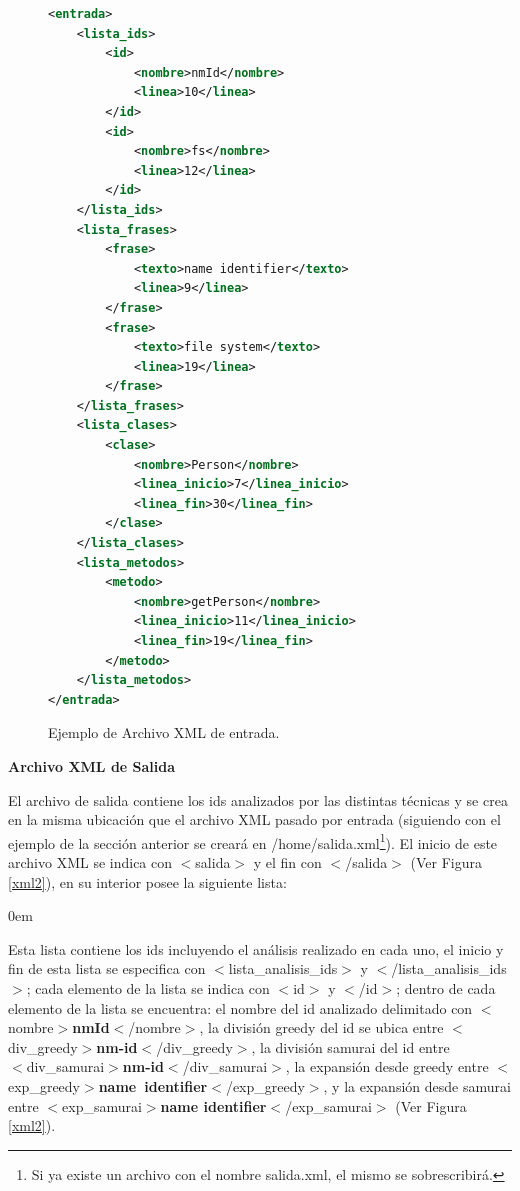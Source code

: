 \begin{appendices}
\newpage
\begin{figure}[h!] %
\begin{lstlisting}[language=xml, frame=single]
<entrada>
	<lista_ids>
		<id>
		    <nombre>nmId</nombre>
		    <linea>10</linea>
		</id>    
		<id>	    	
		    <nombre>fs</nombre>
		    <linea>12</linea>
		</id>    	    	    
	</lista_ids>
	<lista_frases>
		<frase>
			<texto>name identifier</texto>
			<linea>9</linea>
		</frase>
		<frase>
			<texto>file system</texto>
			<linea>19</linea>
		</frase>
	</lista_frases>
	<lista_clases>
		<clase>
			<nombre>Person</nombre>
			<linea_inicio>7</linea_inicio>
			<linea_fin>30</linea_fin>
		</clase>
	</lista_clases>
	<lista_metodos>
		<metodo>
			<nombre>getPerson</nombre>
			<linea_inicio>11</linea_inicio>
			<linea_fin>19</linea_fin>
		</metodo>				
	</lista_metodos>	
</entrada>

\end{lstlisting}
\caption{Ejemplo de Archivo XML de entrada.}
\label{xml1}
\end{figure}

\newpage

\noindent \textbf{Archivo XML de Salida\\}

El archivo de salida contiene los ids analizados por las distintas técnicas y se crea en la misma ubicación que el archivo XML pasado por entrada (siguiendo con el ejemplo de la sección anterior se creará en \textsf{/home/salida.xml}\footnote[1]{Si ya existe un archivo con el nombre salida.xml, el mismo se sobrescribirá.}). El inicio de este archivo XML se indica con \mbox{$<$\textsf{salida}$>$} y el fin con \mbox{$<$/\textsf{salida}$>$} (Ver Figura \ref{xml2}), en su interior posee la siguiente lista:

\begin{description}
\itemsep0em%
\item[Lista de Identificadores Analizados:] Esta lista contiene los ids incluyendo el análisis realizado en cada uno, el inicio y fin de esta lista se especifica con  $<$\textsf{lista\_analisis\_ids}$>$ y $<$/\textsf{lista\_analisis\_ids}$>$; cada elemento de la lista se indica con $<$\textsf{id}$>$ y $<$/\textsf{id}$>$; dentro de cada elemento de la lista se encuentra: el nombre del id analizado delimitado con \mbox{$<$\textsf{nombre}$>$\textbf{nmId}$<$/\textsf{nombre}$>$}, la división greedy del id se ubica entre \mbox{$<$\textsf{div\_greedy}$>$\textbf{nm-id}$<$/\textsf{div\_greedy}$>$}, la división samurai del id entre\\ \mbox{$<$\textsf{div\_samurai}$>$\textbf{nm-id}$<$/\textsf{div\_samurai}$>$}, la expansión desde greedy entre \mbox{$<$\textsf{exp\_greedy}$>$\textbf{name identifier}$<$/\textsf{exp\_greedy}$>$}, y la expansión desde samurai entre $<$\textsf{exp\_samurai}$>$\textbf{name identifier}$<$/\textsf{exp\_samurai}$>$ (Ver Figura \ref{xml2}).
\end{description}


\end{appendices}
